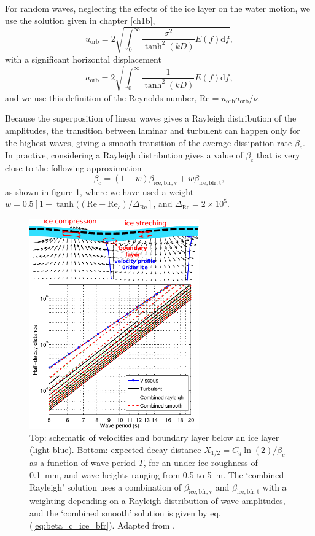 For random waves, neglecting the effects of the 
ice layer on the water motion, we use the solution given in chapter \ref{ch1b}, 
\begin{equation}
u_{\mathrm{orb}}= 2\sqrt{\int_0^\infty \frac{\sigma^2}{\tanh^2(kD)} E(f) \mathrm{d}f },
\end{equation}
with a significant horizontal displacement
\begin{equation}
a_{\mathrm{orb}}= 2\sqrt{\int_0^\infty  \frac{1}{\tanh^2(kD)}E(f) \mathrm{d}f },
\end{equation}
and we use this definition of the Reynolds number, $\mathrm{Re} = u_{\mathrm{orb}} a_{\mathrm{orb}} /\nu$.

Because the superposition of linear waves gives a Rayleigh distribution of the amplitudes, the transition between laminar and turbulent 
can happen only for the highest waves, giving a smooth transition of the average dissipation rate $\beta_c$. In practive, considering a Rayleigh distribution gives a value of $\beta_c$ that is very close to the following approximation 
\begin{equation}
\beta_c= (1-w)  \beta_{\mathrm{ice,bfr,v}} + w \beta_{\mathrm{ice,bfr,t}},\label{eq:beta_c_ice_bfr}
\end{equation}
as shown in figure \ref{fig:under_ice_friction}, where we have used a weight $w=0.5 \left[1 + \tanh((\mathrm{Re}-\mathrm{Re}_c)/\Delta_{\mathrm{Re}}\right]$, and $\Delta_{\mathrm{Re}}=2 \times 10^5$.
\begin{figure}[htb]
\centerline{\includegraphics[width=0.65\textwidth]{FIGS_CH_ICE/under_ice_friction_laminar_turbulent.pdf}}
  \caption{Top: schematic of velocities and boundary layer below an ice layer (light blue). Bottom: expected decay distance $X_{1/2}=C_g \ln(2)/\beta_c $ as a function of wave period $T$, for an under-ice roughness of 0.1~mm, and wave heights ranging from 0.5 to 5~m. The `combined Rayleigh' solution uses a combination of $\beta_{\mathrm{ice,bfr,v}}$ and $\beta_{\mathrm{ice,bfr,t}}$ with a weighting depending on a Rayleigh distribution of wave amplitudes, and the `combined smooth' solution is given by eq. (\ref{eq:beta_c_ice_bfr}). Adapted from \cite{Stopa&al.2016}.} \label{fig:under_ice_friction}
\end{figure}
